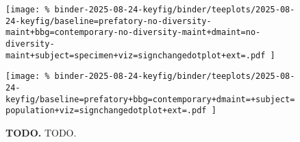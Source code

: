 \begin{figure*}

\raisebox{0.95cm}{%
  \texttt{[image: \%
    binder-2025-08-24-keyfig/binder/teeplots/2025-08-24-keyfig/baseline=prefatory+bbg=contemporary+dmaint=+subject=specimen+viz=signchangedotplot+ext=.pdf
  ]}%
}
%
\texttt{[image: \%
binder-2025-08-24-keyfig/binder/teeplots/2025-08-24-keyfig/baseline=prefatory-no-diversity-maint+bbg=contemporary-no-diversity-maint+dmaint=no-diversity-maint+subject=specimen+viz=signchangedotplot+ext=.pdf
]}

\vspace{-6ex}

\texttt{[image: \%
binder-2025-08-24-keyfig/binder/teeplots/2025-08-24-keyfig/baseline=prefatory+bbg=contemporary+dmaint=+subject=population+viz=signchangedotplot+ext=.pdf
]}

\vspace{-1ex}

\caption{
\textbf{TODO.}
TODO.
}
\label{fig:sign-change-prevatory-vs-contemporary}

\end{figure*}
